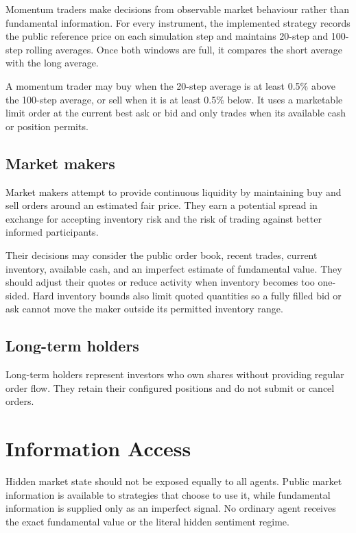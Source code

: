 \documentclass{article}
\begin{document}
Momentum traders make decisions from observable market behaviour rather than
fundamental information. For every instrument, the implemented strategy records
the public reference price on each simulation step and maintains 20-step and
100-step rolling averages. Once both windows are full, it compares the short
average with the long average.

A momentum trader may buy when the 20-step average is at least 0.5\% above the
100-step average, or sell when it is at least 0.5\% below. It uses a marketable
limit order at the current best ask or bid and only trades when its available
cash or position permits.

\subsection{Market makers}

Market makers attempt to provide continuous liquidity by maintaining buy and
sell orders around an estimated fair price. They earn a potential spread in
exchange for accepting inventory risk and the risk of trading against better
informed participants.

Their decisions may consider the public order book, recent trades, current
inventory, available cash, and an imperfect estimate of fundamental value.
They should adjust their quotes or reduce activity when inventory becomes too
one-sided. Hard inventory bounds also limit quoted quantities so a fully filled
bid or ask cannot move the maker outside its permitted inventory range.

\subsection{Long-term holders}

Long-term holders represent investors who own shares without providing regular
order flow. They retain their configured positions and do not submit or cancel
orders.
\section{Information Access}

Hidden market state should not be exposed equally to all agents. Public market
information is available to strategies that choose to use it, while
fundamental information is supplied only as an imperfect signal. No ordinary
agent receives the exact fundamental value or the literal hidden sentiment
regime.
\end{document}
